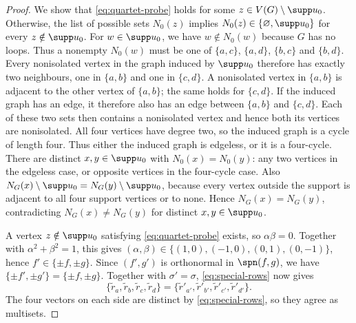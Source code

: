 \begin{proof}
  We show that \cref{eq:quartet-probe} holds for some
  $z\in V(G)\setminus\supp u_0$. Otherwise, the list of
  possible sets $N_0(z)$ implies
  $N_0(z)\in\{\varnothing,\supp u_0\}$ for every
  $z\notin\supp u_0$.
  For $w\in\supp u_0$, we have $w\notin N_0(w)$ because $G$ has no loops.
  Thus a nonempty $N_0(w)$ must be one of
  $\{a,c\}$, $\{a,d\}$, $\{b,c\}$ and $\{b,d\}$.
  Every nonisolated vertex in the graph induced by $\supp u_0$
  therefore has exactly two neighbours, one in $\{a,b\}$ and one in
  $\{c,d\}$. A nonisolated vertex in $\{a,b\}$ is adjacent to the
  other vertex of $\{a,b\}$; the same holds for $\{c,d\}$.
  If the induced graph has an edge, it therefore also has an edge
  between $\{a,b\}$ and $\{c,d\}$.
  Each of these two sets then contains a nonisolated vertex and hence
  both its vertices are nonisolated. All four vertices have degree two,
  so the induced graph is a cycle of length four.
  Thus either the induced graph is edgeless, or it is a four-cycle.
  There are distinct $x,y\in\supp u_0$ with $N_0(x)=N_0(y)$:
  any two vertices in the edgeless case, or opposite vertices in the
  four-cycle case. Also
  $N_G(x)\setminus\supp u_0=N_G(y)\setminus\supp u_0$, because every
  vertex outside the support is adjacent to all four support vertices
  or to none. Hence $N_G(x)=N_G(y)$, contradicting
  $N_G(x)\ne N_G(y)$ for distinct $x,y\in\supp u_0$.

  A vertex $z\notin\supp u_0$ satisfying \cref{eq:quartet-probe}
  exists, so $\alpha\beta=0$. Together with $\alpha^2+\beta^2=1$,
  this gives $(\alpha,\beta)\in\{(1,0),(-1,0),(0,1),(0,-1)\}$,
  hence $f'\in\{\pm f,\pm g\}$. Since $(f',g')$ is orthonormal in
  $\spn(f,g)$, we have $\{\pm f',\pm g'\}=\{\pm f,\pm g\}$.
  Together with $\sigma'=\sigma$, \cref{eq:special-rows} now gives
  \begin{equation}\label{eq:quartet-row-equality}
    \{\tilde{r}_a,\tilde{r}_b,\tilde{r}_c,\tilde{r}_d\}
    =\{\tilde{r}'_{a'},\tilde{r}'_{b'},\tilde{r}'_{c'},\tilde{r}'_{d'}\}.
  \end{equation}
  The four vectors on each side are distinct by \cref{eq:special-rows},
  so they agree as multisets.
\end{proof}

